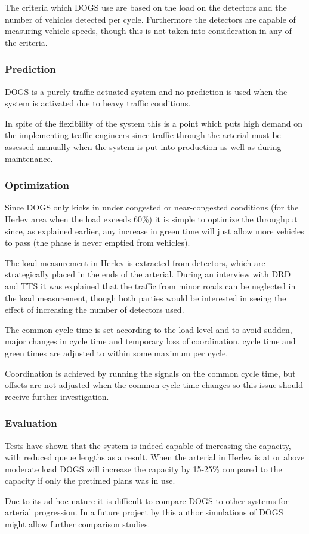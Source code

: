 The criteria which DOGS use are based on the load on the detectors and the number of vehicles detected per cycle. Furthermore the detectors are capable of measuring vehicle speeds, though this is not taken into consideration in any of the criteria.

\subsubsection*{Prediction}
DOGS is a purely traffic actuated system and no prediction is used when the system is activated due to heavy traffic conditions.

In spite of the flexibility of the system this is a point which puts high demand on the implementing traffic engineers since traffic through the arterial must be assessed manually when the system is put into production as well as during maintenance.

\subsubsection*{Optimization}
Since DOGS only kicks in under congested or near-congested conditions (for the Herlev area when the load exceeds 60\%) it is simple to optimize the throughput since, as explained earlier, any increase in green time will just allow more vehicles to pass (the phase is never emptied from vehicles).

The load measurement in Herlev is extracted from detectors, which are strategically placed in the ends of the arterial. During an interview with DRD and TTS it was explained that the traffic from minor roads can be neglected in the load measurement, though both parties would be interested in seeing the effect of increasing the number of detectors used.

The common cycle time is set according to the load level and to avoid sudden, major changes in cycle time and temporary loss of coordination, cycle time and green times are adjusted to within some maximum per cycle. 

Coordination is achieved by running the signals on the common cycle time, but offsets are not adjusted when the common cycle time changes so this issue should receive further investigation.

\subsubsection*{Evaluation}
Tests have shown that the system is indeed capable of increasing the capacity, with reduced queue lengths as a result. When the arterial in Herlev is at or above moderate load DOGS will increase the capacity by 15-25\% compared to the capacity if only the pretimed plans was in use.

Due to its ad-hoc nature it is difficult to compare DOGS to other systems for arterial progression. In a future project by this author simulations of DOGS might allow further comparison studies.